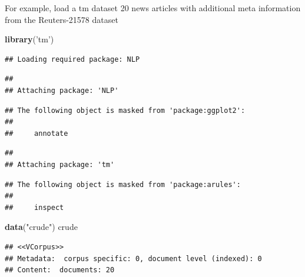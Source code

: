 \documentclass[]{book}
\newenvironment{Shaded}{\begin{snugshade}}{\end{snugshade}}
\newcommand{\KeywordTok}[1]{\textcolor[rgb]{0.13,0.29,0.53}{\textbf{{#1}}}}
\newcommand{\DecValTok}[1]{\textcolor[rgb]{0.00,0.00,0.81}{{#1}}}
\newcommand{\StringTok}[1]{\textcolor[rgb]{0.31,0.60,0.02}{{#1}}}
\newcommand{\CommentTok}[1]{\textcolor[rgb]{0.56,0.35,0.01}{\textit{{#1}}}}
\newcommand{\NormalTok}[1]{{#1}}
\begin{document}
For example, load a tm dataset 20 news articles with additional meta
information from the Reuters-21578 dataset

\begin{Shaded}
\begin{Highlighting}[]
\KeywordTok{library}\NormalTok{(}\StringTok{'tm'}\NormalTok{)}
\end{Highlighting}
\end{Shaded}

\begin{verbatim}
## Loading required package: NLP
\end{verbatim}

\begin{verbatim}
## 
## Attaching package: 'NLP'
\end{verbatim}

\begin{verbatim}
## The following object is masked from 'package:ggplot2':
## 
##     annotate
\end{verbatim}

\begin{verbatim}
## 
## Attaching package: 'tm'
\end{verbatim}

\begin{verbatim}
## The following object is masked from 'package:arules':
## 
##     inspect
\end{verbatim}

\begin{Shaded}
\begin{Highlighting}[]
\KeywordTok{data}\NormalTok{(}\StringTok{"crude"}\NormalTok{)}
\NormalTok{crude}
\end{Highlighting}
\end{Shaded}

\begin{verbatim}
## <<VCorpus>>
## Metadata:  corpus specific: 0, document level (indexed): 0
## Content:  documents: 20
\end{verbatim}

\begin{Shaded}
\end{Shaded}
\end{document}
